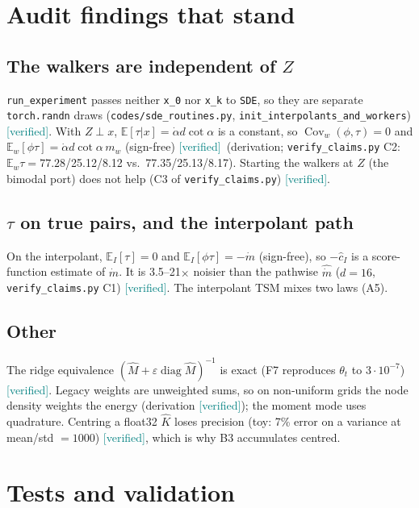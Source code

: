\documentclass[11pt,a4paper]{article}
\newcommand{\code}[1]{\texttt{#1}}
\newcommand{\ver}{\textcolor{teal}{\textsf{[verified]}}}
\newcommand{\E}{\mathbb{E}}
\newcommand{\Cov}{\operatorname{Cov}}
\begin{document}
\section{Audit findings that stand}
\subsection{The walkers are independent of $Z$}\label{sec:indep}
\code{run\_experiment} passes neither \code{x\_0} nor \code{x\_k} to \code{SDE}, so they are separate \code{torch.randn} draws
(\code{codes/sde\_routines.py}, \code{init\_interpolants\_and\_workers}) \ver. With $Z\perp x$, $\E[\tau|x]=\dot\alpha d\cot\alpha$ is a constant, so
$\Cov_w(\phi,\tau)=0$ and $\E_w[\phi\tau]=\dot\alpha d\cot\alpha\,m_w$ (sign-free) \ver\ (derivation; \code{verify\_claims.py} C2: $\E_w\tau=77.28$/25.12/8.12 vs.\
77.35/25.13/8.17). Starting the walkers at $Z$ (the bimodal port) does not help (C3 of \code{verify\_claims.py}) \ver.

\subsection{$\tau$ on true pairs, and the interpolant path}
On the interpolant, $\E_I[\tau]=0$ and $\E_I[\phi\tau]=-\dot m$ (sign-free), so $-\hat c_I$ is a score-function estimate of $\dot m$. It is 3.5--21$\times$
noisier than the pathwise $\hat{\dot m}$ ($d=16$, \code{verify\_claims.py} C1) \ver. The interpolant TSM mixes two laws (A5).

\subsection{Other}
The ridge equivalence $(\hat M+\varepsilon\operatorname{diag}\hat M)^{-1}$ is exact (F7 reproduces $\theta_t$ to $3\cdot10^{-7}$) \ver. Legacy weights are
unweighted sums, so on non-uniform grids the node density weights the energy (derivation \ver); the moment mode uses quadrature. Centring a
float32 $\hat K$ loses precision (toy: 7\% error on a variance at mean/std $=1000$) \ver, which is why B3 accumulates centred.

\section{Tests and validation}\label{sec:valid}
\end{document}
